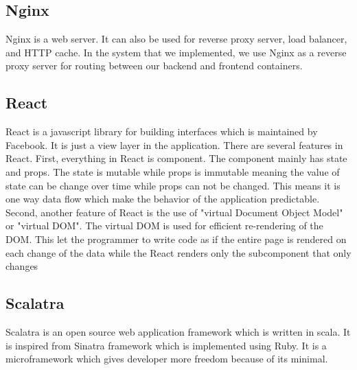     \subsection{Nginx}
        Nginx\cite{nginx} is a web server. It can also be used for reverse proxy server, load balancer, and HTTP cache. In the system that we implemented, we use Nginx as a reverse proxy server for routing between our backend and frontend containers.
        
    \subsection{React}
        React\cite{react} is a javascript library for building interfaces which is maintained by Facebook. It is just a view layer in the application. There are several features in React. First, everything in React is component. The component mainly has state and props. The state is mutable while props is immutable meaning the value of state can be change over time while props can not be changed. This means it is one way data flow which make the behavior of the application predictable. Second, another feature of React is the use of "virtual Document Object Model" or "virtual DOM". The virtual DOM is used for efficient re-rendering of the DOM. This let the programmer to write code as if the entire page is rendered on each change of the data while the React renders only the subcomponent that only changes
        
    \subsection{Scalatra}
        Scalatra\cite{scalatra} is an open source web application framework which is written in scala. It is inspired from Sinatra framework which is implemented using Ruby. It is a microframework which gives developer more freedom because of its minimal.


